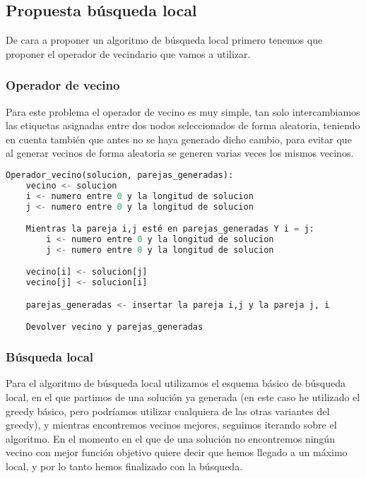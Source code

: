 \subsection{Propuesta búsqueda local}

De cara a proponer un algoritmo de búsqueda local primero tenemos que proponer el operador de vecindario que vamos a utilizar.

\subsubsection{Operador de vecino}

Para este problema el operador de vecino es muy simple, tan solo intercambiamos las etiquetas asignadas entre dos nodos seleccionados de forma aleatoria, teniendo en cuenta también que antes no se haya generado dicho cambio, para evitar que al generar vecinos de forma aleatoria se generen varias veces los mismos vecinos.

\begin{lstlisting}[language=python]
Operador_vecino(solucion, parejas_generadas):
	vecino <- solucion
	i <- numero entre 0 y la longitud de solucion
	j <- numero entre 0 y la longitud de solucion

	Mientras la pareja i,j esté en parejas_generadas Y i = j:
		i <- numero entre 0 y la longitud de solucion
		j <- numero entre 0 y la longitud de solucion

	vecino[i] <- solucion[j]
	vecino[j] <- solucion[i]

	parejas_generadas <- insertar la pareja i,j y la pareja j, i

	Devolver vecino y parejas_generadas
\end{lstlisting}

\subsubsection{Búsqueda local}

Para el algoritmo de búsqueda local utilizamos el esquema básico de búsqueda local, en el que partimos de una solución ya generada (en este caso he utilizado el greedy básico, pero podríamos utilizar cualquiera de las otras variantes del greedy), y mientras encontremos vecinos mejores, seguimos iterando sobre el algoritmo. En el momento en el que de una solución no encontremos ningún vecino con mejor función objetivo quiere decir que hemos llegado a un máximo local, y por lo tanto hemos finalizado con la búsqueda.

